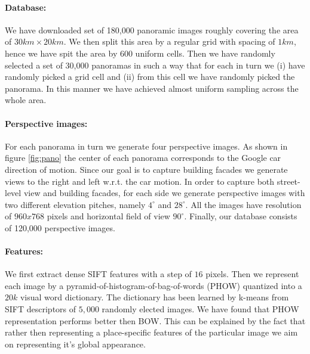 \documentclass[runningheads, table]{llncs}
\begin{document}


  \paragraph{Database:}
  We have downloaded set of 180,000 panoramic images \cite{Gronat11} roughly covering the area of $30km \times 20km$. We then split this area by a regular grid with spacing of $1km$, hence we have spit the area by 600 uniform cells. Then we have randomly selected a set of 30,000 panoramas in such a way that for each in turn we (i) have randomly picked a grid cell and (ii) from this cell we have randomly picked the panorama. In this manner we have achieved almost uniform sampling across the whole area.

  \paragraph{Perspective images:}
  For each panorama in turn we generate four perspective images. As shown in figure \ref{fig:pano} the center of each panorama corresponds to the Google car direction of motion. Since our goal is to capture building facades we generate views to the right and left w.r.t. the car motion. In order to capture both street-level view and building facades, for each side we generate perspective images with two different elevation pitches, namely $4^\circ$ and $28^\circ$. All the images have resolution of $960x768$ pixels and horizontal field of view $90^\circ$. Finally, our database consists of 120,000 perspective images.

  \paragraph{Features:}
  We first extract dense SIFT features with a step of $16$ pixels. Then we represent each image by a pyramid-of-histogram-of-bag-of-words (PHOW) \cite{} quantized into a $20k$ visual word dictionary. The dictionary has been learned by k-means from SIFT descriptors of $5,000$ randomly elected images. We have found that PHOW representation performs better then BOW. This can be explained by the fact that rather then representing a place-specific features of the particular image we aim on representing it's global appearance.
\end{document}
